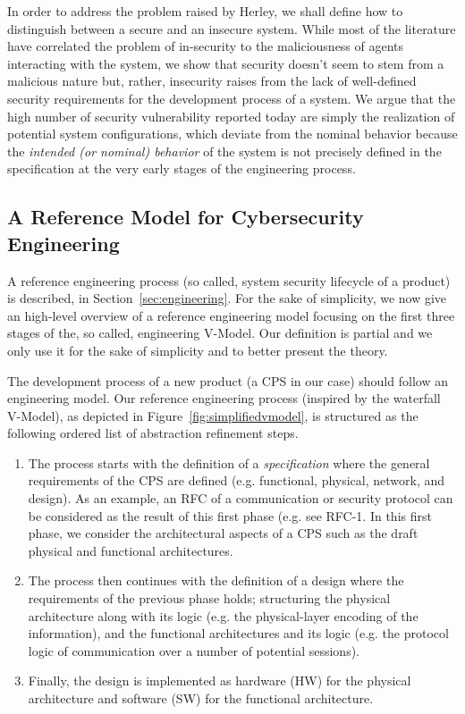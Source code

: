 In order to address the problem raised by Herley, we shall define how to
distinguish between a secure and an insecure system.  While most of the
literature have correlated the problem of in-security
to the maliciousness of agents interacting with the system, we show that
security doesn't seem to stem from a malicious nature but, rather, insecurity
raises from the lack of well-defined security requirements for the development
process of a system. We argue that the high number of security vulnerability
reported today are simply the realization of potential system configurations,
which deviate from the nominal behavior because the \emph{intended (or
nominal) behavior} of the system is not precisely defined in the specification
at the very early stages of the engineering process.   

\subsection{A Reference Model for Cybersecurity Engineering}\label{sec:vmodel}
A reference engineering process (so called, system security lifecycle of a
product) is described, in Section~\ref{sec:engineering}.  For the sake of
simplicity, we now give an high-level overview of a reference engineering model
focusing on the first three stages of the, so called, engineering V-Model. Our
definition is partial and we only use it for the sake of simplicity and to
better present the theory.

The development process of a new product (a CPS in our case) 
should follow an engineering model. Our reference engineering process 
(inspired by the waterfall V-Model), as depicted in
Figure~\ref{fig:simplifiedvmodel}, is structured as the following ordered list
of abstraction refinement steps.
\begin{enumerate}
	\item The process starts with the definition of a \emph{specification}
		where the general requirements of the CPS are defined (e.g.
		functional, physical, network, and design).  As an example, an
		RFC of a communication or security protocol can be considered
		as the result of this first phase (e.g. see
		RFC-1\autocite{rfc1}.  In this first phase, we consider the
		architectural aspects of a CPS such as the draft physical and
		functional architectures.
	\item The process then continues with the definition of a design where
		the requirements of the previous phase holds; structuring the
		physical architecture along with its logic (e.g. the physical-layer encoding of the
		information), and the functional architectures and its logic (e.g. the protocol
		logic of communication over a number of potential sessions).
	\item Finally, the design is implemented as hardware (HW) for the physical architecture
		and software (SW) for the functional architecture.
\end{enumerate}

